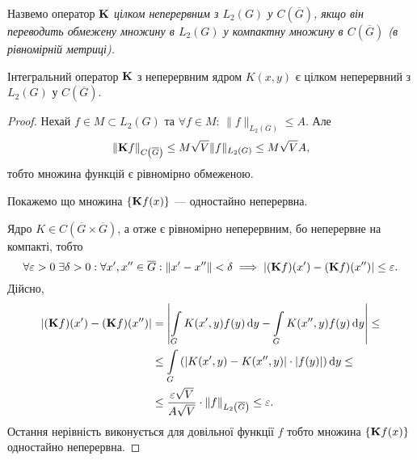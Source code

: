 \begin{definition}
	Назвемо оператор $\bf{K}$ \it{цілком неперервним} з $L_2(G)$ у $C\left(\overline G\right)$, якщо він переводить обмежену множину в $L_2(G)$ у компактну множину в $C\left(\overline G\right)$ (в рівномірній метриці).
\end{definition}

\begin{lemma}
	Інтегральний оператор $\bf{K}$ з неперервним ядром $K(x, y)$ є цілком неперервний з $L_2(G)$ у $C\left(\overline G\right)$.
\end{lemma}

\begin{proof}
	Нехай $f \in M \subset L_2(G)$ та $\forall f \in M$: $\|f\|_{L_2(G)} \le A$. Але 
	\begin{equation}
		\|\bf{K} f\|_{C\left(\overline G\right)} \le M \sqrt{V} \|f\|_{L_2(G)} \le M \sqrt{V} A,	
	\end{equation}
	тобто множина функцій є рівномірно обмеженою. \medskip

	Покажемо що множина $\{ \bf{K}f(x)\}$ --- одностайно неперервна. \medskip

	Ядро $K \in C\left(\overline G \times \overline G\right)$, а отже є рівномірно неперервним, бо неперервне на компакті, тобто
	\begin{equation}
		\forall \epsilon > 0  \-\;\exists \delta > 0: \forall x', x'' \in \overline G: \left\|x' - x''\right\| < \delta \implies \left|(\bf{K}f)(x') - (\bf{K}f)(x'')\right| \le \epsilon.
	\end{equation}
	Дійсно,
	\begin{equation}
		\begin{aligned}
			|(\bf{K}f)(x') - (\bf{K}f)(x'')| &= \left| \Int_G K(x', y) f(y) \diff y - \Int_G K(x'', y) f(y) \diff y \right| \le \\
			&\le \Int_G \left( |K(x', y) - K(x'', y)| \cdot |f(y)| \right) \diff y \le \\
			&\le \dfrac{\epsilon \sqrt{V}}{A \sqrt{V}} \cdot \|f\|_{L_2\left(\overline G\right)} \le \epsilon.
		\end{aligned}
	\end{equation}
	Остання нерівність виконується для довільної функції $f$ тобто множина  $\{ \bf{K}f(x)\}$ одностайно неперервна.
\end{proof}

\newpage

